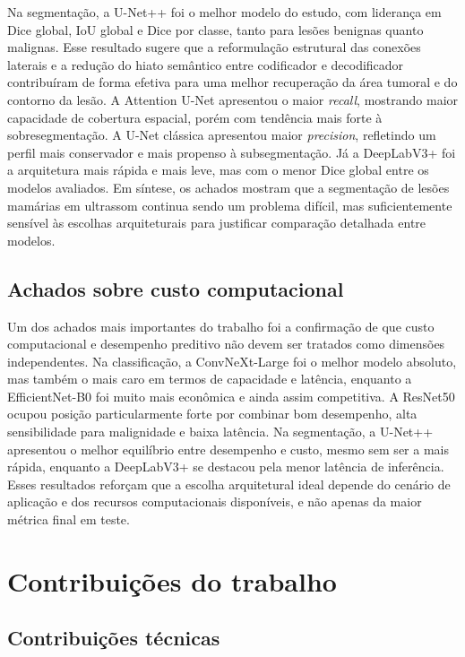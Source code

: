 \documentclass[tcc,capa]{texufpel}
\begin{document}
Na segmentação, a U-Net++ foi o melhor modelo do estudo, com liderança em Dice global, IoU global e Dice por classe, tanto para lesões benignas quanto malignas. Esse resultado sugere que a reformulação estrutural das conexões laterais e a redução do hiato semântico entre codificador e decodificador contribuíram de forma efetiva para uma melhor recuperação da área tumoral e do contorno da lesão. A Attention U-Net apresentou o maior \textit{recall}, mostrando maior capacidade de cobertura espacial, porém com tendência mais forte à sobresegmentação. A U-Net clássica apresentou maior \textit{precision}, refletindo um perfil mais conservador e mais propenso à subsegmentação. Já a DeepLabV3+ foi a arquitetura mais rápida e mais leve, mas com o menor Dice global entre os modelos avaliados. Em síntese, os achados mostram que a segmentação de lesões mamárias em ultrassom continua sendo um problema difícil, mas suficientemente sensível às escolhas arquiteturais para justificar comparação detalhada entre modelos. 

\subsection{Achados sobre custo computacional}

Um dos achados mais importantes do trabalho foi a confirmação de que custo computacional e desempenho preditivo não devem ser tratados como dimensões independentes. Na classificação, a ConvNeXt-Large foi o melhor modelo absoluto, mas também o mais caro em termos de capacidade e latência, enquanto a EfficientNet-B0 foi muito mais econômica e ainda assim competitiva. A ResNet50 ocupou posição particularmente forte por combinar bom desempenho, alta sensibilidade para malignidade e baixa latência. Na segmentação, a U-Net++ apresentou o melhor equilíbrio entre desempenho e custo, mesmo sem ser a mais rápida, enquanto a DeepLabV3+ se destacou pela menor latência de inferência. Esses resultados reforçam que a escolha arquitetural ideal depende do cenário de aplicação e dos recursos computacionais disponíveis, e não apenas da maior métrica final em teste. 

\section{Contribuições do trabalho}

\subsection{Contribuições técnicas}
\end{document}
